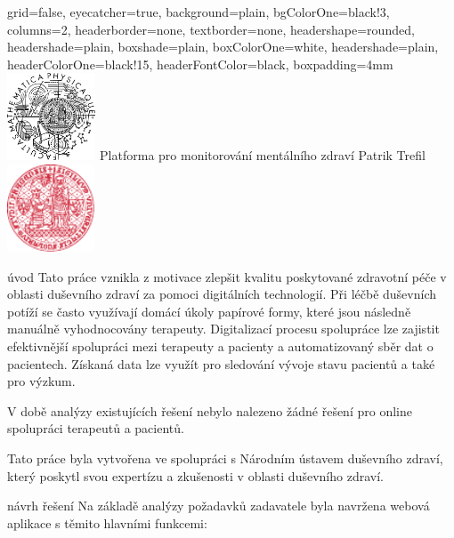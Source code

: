 \documentclass[portrait,a0paper,fontscale=0.25]{baposter}
\begin{document}
    \color{black!80} %
    \begin{poster}{grid=false,
        eyecatcher=true,
        background=plain,
        bgColorOne=black!3, %
        columns=2,
        headerborder=none,
        textborder=none,
        headershape=rounded,
        headershade=plain,
        boxshade=plain,
        boxColorOne=white,
        headershade=plain,
        headerColorOne=black!15, %
        headerFontColor=black,
        boxpadding=4mm
    }%
    {\includegraphics[height=7em]{logos/mff-black}}
    {Platforma pro monitorování mentálního zdraví}
    {\vspace{1ex} Patrik Trefil}
    {\includegraphics[height=7em]{logos/uk-red}}


%
%

        \begin{posterbox}[column=0,name=intro]{úvod}
            Tato práce vznikla z motivace zlepšit kvalitu poskytované zdravotní péče v oblasti duševního zdraví za pomoci digitálních technologií.
            Při léčbě duševních potíží se často využívají domácí úkoly papírové formy, které jsou následně manuálně vyhodnocovány terapeuty.
            Digitalizací procesu spolupráce lze zajistit efektivnější spolupráci mezi terapeuty a pacienty a automatizovaný sběr dat o pacientech.
            Získaná data lze využít pro sledování vývoje stavu pacientů a také pro výzkum.

            V době analýzy existujících řešení nebylo nalezeno žádné řešení pro online spolupráci terapeutů a pacientů.

            Tato práce byla vytvořena ve spolupráci s Národním ústavem duševního zdraví, který poskytl svou expertízu a zkušenosti v oblasti duševního zdraví.
        \end{posterbox}

        \begin{posterbox}[column=0, name=goals, below=intro]{návrh řešení}
            Na základě analýzy požadavků zadavatele byla navržena webová aplikace s těmito hlavními funkcemi:


\end{posterbox}
\end{poster}
\end{document}
